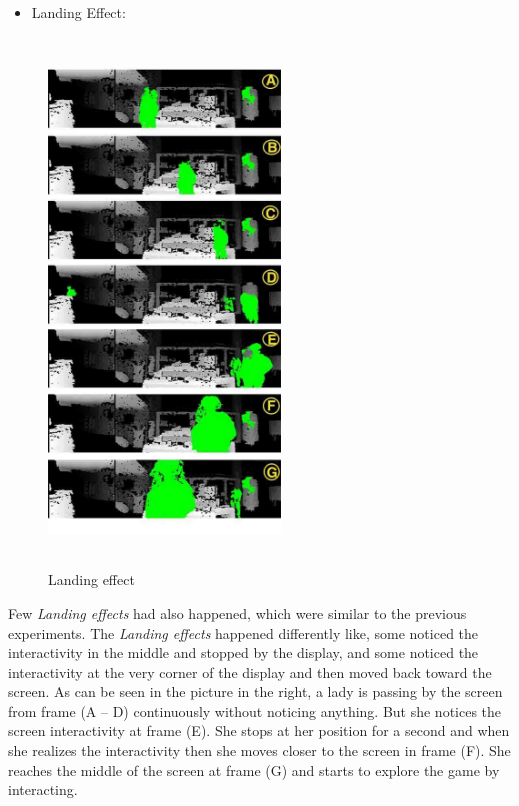 



\newpage
\begin{itemize}

\item Landing Effect:

\end{itemize}


\begin{figure}
  \vspace{-30pt}
  \begin{center}
    \includegraphics[width=0.55\textwidth,height=140mm]{Figures/9/effects/landing}
  \end{center}
  \vspace{-20pt}
  \caption{Landing effect}
  \vspace{-60pt}
\end{figure}
Few \emph{Landing effects} had also happened, which were similar to the previous experiments. The \emph{Landing effects} happened differently like, some noticed the interactivity in the middle and stopped by the display, and some noticed the interactivity at the very corner of the display and then moved back toward the screen.
As can be seen in the picture in the right, a lady is passing by the screen from frame (A – D) continuously without noticing anything. But she notices the screen interactivity at frame (E). She stops at her position for a second and when she realizes the interactivity then she moves closer to the screen in frame (F). She reaches the middle of the screen at frame (G) and starts to explore the game by interacting.
\break
\break
\break
\break
\break
\break
\break
\break
\break
\break
\break

